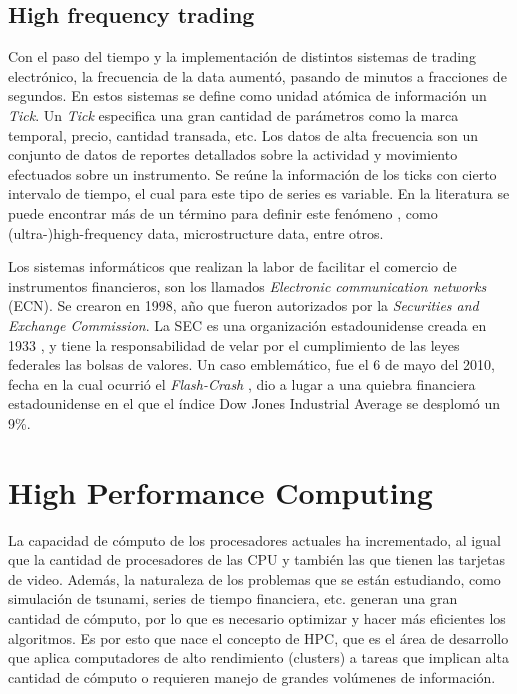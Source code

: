 \subsection{High frequency trading}

Con el paso del tiempo y la implementación de distintos sistemas de trading electrónico, la frecuencia de la data aumentó, pasando de minutos a fracciones de segundos. 
En estos sistemas se define como unidad atómica de información un \emph{Tick}. Un \emph{Tick} especifica una gran cantidad de parámetros como la marca temporal, precio, cantidad transada, etc. 
Los datos de alta frecuencia son un conjunto de datos de reportes detallados sobre la actividad y movimiento efectuados sobre un instrumento. Se reúne la información 
de los ticks con cierto intervalo de tiempo, el cual para este tipo de series es variable. En la literatura se puede encontrar más de un término para definir este fenómeno \cite{ei2007quantitative},
como (ultra-)high-frequency data, microstructure data, entre otros.



Los sistemas informáticos que realizan la labor de facilitar el comercio de instrumentos financieros, son los llamados \emph{Electronic communication networks} (ECN).
Se crearon en 1998, año que fueron autorizados por la \emph{Securities and Exchange Commission}. La SEC es una organización estadounidense creada en 1933 \cite{hasbrouck2004economic}, 
y tiene la responsabilidad de velar por el cumplimiento de las leyes federales las bolsas de valores. Un caso emblemático, fue el 6 de mayo del 2010, fecha en la cual ocurrió el 
\emph{Flash-Crash} \cite{arndt2011high}, dio a lugar a una quiebra financiera estadounidense en el que el índice Dow Jones Industrial Average se desplomó un 9\%.

\section{High Performance Computing}

La capacidad de cómputo de los procesadores actuales ha incrementado, al igual que la cantidad de procesadores de las CPU y también las que tienen las tarjetas de video. Además, la
naturaleza de los problemas que se están estudiando, como simulación de tsunami, series de tiempo financiera, etc. generan una gran cantidad de cómputo, por lo que es
necesario optimizar y hacer más eficientes los algoritmos. Es por esto que nace el concepto de HPC, que es el área de desarrollo que aplica computadores de alto rendimiento 
(clusters) a tareas que implican alta cantidad de cómputo o requieren manejo de grandes volúmenes de información. 

